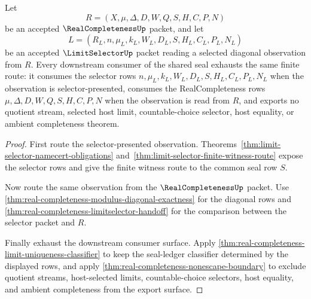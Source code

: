 \begin{theorem}
\label{thm:real-completeness-seal-consumer-exhaustion}
Let
$$
R=(X,\mu,\Delta,D,W,Q,S,H,C,P,N)
$$
be an accepted $\RealCompletenessUp$ packet, and let
$$
L=(R_L,n,\mu_L,k_L,W_L,D_L,S,H_L,C_L,P_L,N_L)
$$
be an accepted $\LimitSelectorUp$ packet reading a selected diagonal observation from $R$. Every downstream consumer of the shared seal exhausts the same finite route: it consumes the selector rows $n,\mu_L,k_L,W_L,D_L,S,H_L,C_L,P_L,N_L$ when the observation is selector-presented, consumes the RealCompleteness rows $\mu,\Delta,D,W,Q,S,H,C,P,N$ when the observation is read from $R$, and exports no quotient stream, selected host limit, countable-choice selector, host equality, or ambient completeness theorem.
\end{theorem}
\begin{proof}
First route the selector-presented observation. Theorems~\ref{thm:limit-selector-namecert-obligations} and~\ref{thm:limit-selector-finite-witness-route} expose the selector rows and give the finite witness route to the common seal row $S$.

Now route the same observation from the $\RealCompletenessUp$ packet. Use \autoref{thm:real-completeness-modulus-diagonal-exactness} for the diagonal rows and \autoref{thm:real-completeness-limitselector-handoff} for the comparison between the selector packet and $R$.

Finally exhaust the downstream consumer surface. Apply \autoref{thm:real-completeness-limit-uniqueness-classifier} to keep the seal-ledger classifier determined by the displayed rows, and apply \autoref{thm:real-completeness-nonescape-boundary} to exclude quotient streams, host-selected limits, countable-choice selectors, host equality, and ambient completeness from the export surface.
\end{proof}

